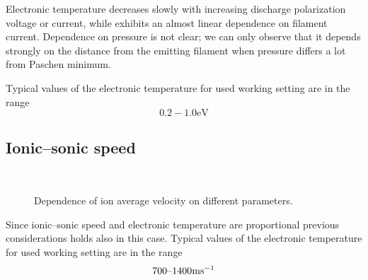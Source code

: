 \documentclass[11pt,a4 paper]{article}
\begin{document}
Electronic temperature decreases slowly with increasing discharge polarization voltage or current, while exhibits an almost linear dependence on filament current. Dependence on pressure is not clear; we can only observe that it depends strongly on the distance from the emitting filament when pressure differs a lot from Paschen minimum.

Typical values of the electronic temperature for used working setting are in the range 
\[0.2-1.0\si\electronvolt\]

\subsection{Ionic--sonic speed}
\begin{figure}[H]
\\%
 \caption{Dependence of ion average velocity on different parameters.}\label{fig:cs}%
\end{figure}%
Since ionic--sonic speed and electronic temperature are proportional previous considerations holds also in this case. 
Typical values of the electronic temperature for used working setting are in the range 
\[700\textup{--}1400\si{\metre\second^{-1}}\]
\end{document}
